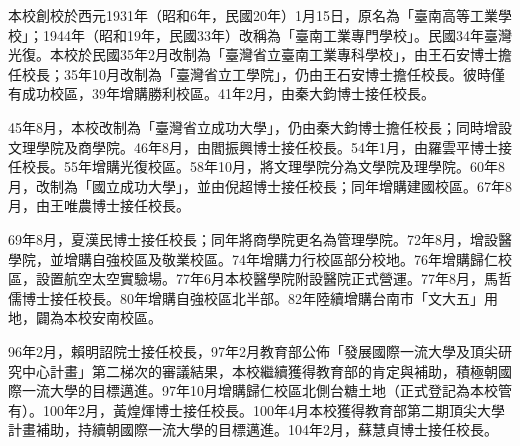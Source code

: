 
本校創校於西元1931年（昭和6年，民國20年）1月15日，原名為「臺南高等工業學校」；1944年（昭和19年，民國33年）改稱為「臺南工業專門學校」。民國34年臺灣光復。本校於民國35年2月改制為「臺灣省立臺南工業專科學校」，由王石安博士擔任校長；35年10月改制為「臺灣省立工學院」，仍由王石安博士擔任校長。彼時僅有成功校區，39年增購勝利校區。41年2月，由秦大鈞博士接任校長。

45年8月，本校改制為「臺灣省立成功大學」，仍由秦大鈞博士擔任校長；同時增設文理學院及商學院。46年8月，由閻振興博士接任校長。54年1月，由羅雲平博士接任校長。55年增購光復校區。58年10月，將文理學院分為文學院及理學院。60年8月，改制為「國立成功大學」，並由倪超博士接任校長；同年增購建國校區。67年8月，由王唯農博士接任校長。

69年8月，夏漢民博士接任校長；同年將商學院更名為管理學院。72年8月，增設醫學院，並增購自強校區及敬業校區。74年增購力行校區部分校地。76年增購歸仁校區，設置航空太空實驗場。77年6月本校醫學院附設醫院正式營運。77年8月，馬哲儒博士接任校長。80年增購自強校區北半部。82年陸續增購台南市「文大五」用地，闢為本校安南校區。

96年2月，賴明詔院士接任校長，97年2月教育部公佈「發展國際一流大學及頂尖研究中心計畫」第二梯次的審議結果，本校繼續獲得教育部的肯定與補助，積極朝國際一流大學的目標邁進。97年10月增購歸仁校區北側台糖土地（正式登記為本校管有）。100年2月，黃煌煇博士接任校長。100年4月本校獲得教育部第二期頂尖大學計畫補助，持續朝國際一流大學的目標邁進。104年2月，蘇慧貞博士接任校長。

\newpage
{}


